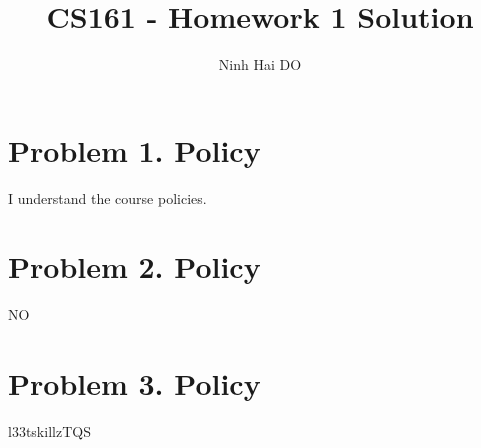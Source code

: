\documentclass{article}
\title{CS161 - Homework 1 Solution}
\author{Ninh Hai DO}
\begin{document}
\maketitle

\section{Problem 1. Policy}
I understand the course policies.

\section{Problem 2. Policy}
NO

\section{Problem 3. Policy}
l33tskillzTQS
\end{document}

